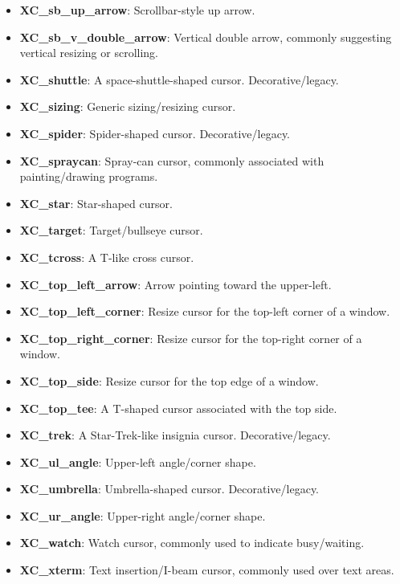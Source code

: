 \documentclass{report}
\begin{document}
\begin{itemize}
\begin{itemize}
                \item \textbf{XC\_sb\_up\_arrow}:	Scrollbar-style up arrow.
                \item \textbf{XC\_sb\_v\_double\_arrow}:	Vertical double arrow, commonly suggesting vertical resizing or scrolling.
                \item \textbf{XC\_shuttle}:	A space-shuttle-shaped cursor. Decorative/legacy.
                \item \textbf{XC\_sizing}:	Generic sizing/resizing cursor.
                \item \textbf{XC\_spider}:	Spider-shaped cursor. Decorative/legacy.
                \item \textbf{XC\_spraycan}:	Spray-can cursor, commonly associated with painting/drawing programs.
                \item \textbf{XC\_star}:	Star-shaped cursor.
                \item \textbf{XC\_target}:	Target/bullseye cursor.
                \item \textbf{XC\_tcross}:	A T-like cross cursor.
                \item \textbf{XC\_top\_left\_arrow}:	Arrow pointing toward the upper-left.
                \item \textbf{XC\_top\_left\_corner}:	Resize cursor for the top-left corner of a window.
                \item \textbf{XC\_top\_right\_corner}:	Resize cursor for the top-right corner of a window.
                \item \textbf{XC\_top\_side}:	Resize cursor for the top edge of a window.
                \item \textbf{XC\_top\_tee}:	A T-shaped cursor associated with the top side.
                \item \textbf{XC\_trek}:	A Star-Trek-like insignia cursor. Decorative/legacy.
                \item \textbf{XC\_ul\_angle}:	Upper-left angle/corner shape.
                \item \textbf{XC\_umbrella}:	Umbrella-shaped cursor. Decorative/legacy.
                \item \textbf{XC\_ur\_angle}:	Upper-right angle/corner shape.
                \item \textbf{XC\_watch}:	Watch cursor, commonly used to indicate busy/waiting.
                \item \textbf{XC\_xterm}:	Text insertion/I-beam cursor, commonly used over text areas.
            \end{itemize}

\end{itemize}
\end{document}

